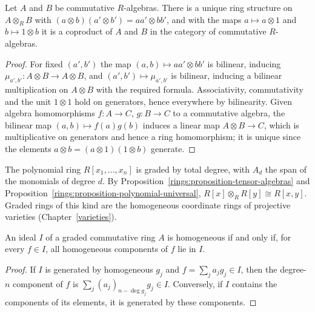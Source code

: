 \begin{proposition}\label{rings:proposition-tensor-algebras}
Let $A$ and $B$ be commutative $R$-algebras. There is a unique ring structure on
$A \otimes_R B$ with $(a \otimes b)(a' \otimes b') = aa' \otimes bb'$, and with the maps
$a \mapsto a \otimes 1$ and $b \mapsto 1 \otimes b$ it is a coproduct of $A$ and $B$ in the category of
commutative $R$-algebras.
\end{proposition}

\begin{proof}
For fixed $(a', b')$ the map $(a, b) \mapsto aa' \otimes bb'$ is bilinear, inducing
$\mu_{a',b'} \colon A \otimes B \to A \otimes B$, and $(a', b') \mapsto \mu_{a',b'}$ is bilinear, inducing a
bilinear multiplication on $A \otimes B$ with the required formula. Associativity,
commutativity and the unit $1 \otimes 1$ hold on generators, hence everywhere by
bilinearity. Given algebra homomorphisms $f \colon A \to C$, $g \colon B \to C$ to a commutative
algebra, the bilinear map $(a, b) \mapsto f(a)g(b)$ induces a linear map
$A \otimes B \to C$, which is multiplicative on generators and hence a ring homomorphism;
it is unique since the elements $a \otimes b = (a \otimes 1)(1 \otimes b)$ generate.
\end{proof}

\begin{example}\label{rings:example-graded}
The polynomial ring $R[x_1, \ldots, x_n]$ is graded by total degree, with $A_d$ the span of
the monomials of degree $d$. By Proposition~\ref{rings:proposition-tensor-algebras} and
Proposition~\ref{rings:proposition-polynomial-universal},
$R[x] \otimes_R R[y] \cong R[x, y]$. Graded rings of this kind are the homogeneous coordinate
rings of projective varieties (Chapter~\ref{varieties}).
\end{example}

\begin{lemma}\label{rings:lemma-homogeneous-ideal}
An ideal $I$ of a graded commutative ring $A$ is homogeneous if and only if, for every
$f \in I$, all homogeneous components of $f$ lie in $I$.
\end{lemma}

\begin{proof}
If $I$ is generated by homogeneous $g_j$ and $f = \sum_j a_j g_j \in I$, then the degree-$n$
component of $f$ is $\sum_j (a_j)_{n - \deg g_j} g_j \in I$. Conversely, if $I$ contains the
components of its elements, it is generated by these components.
\end{proof}

